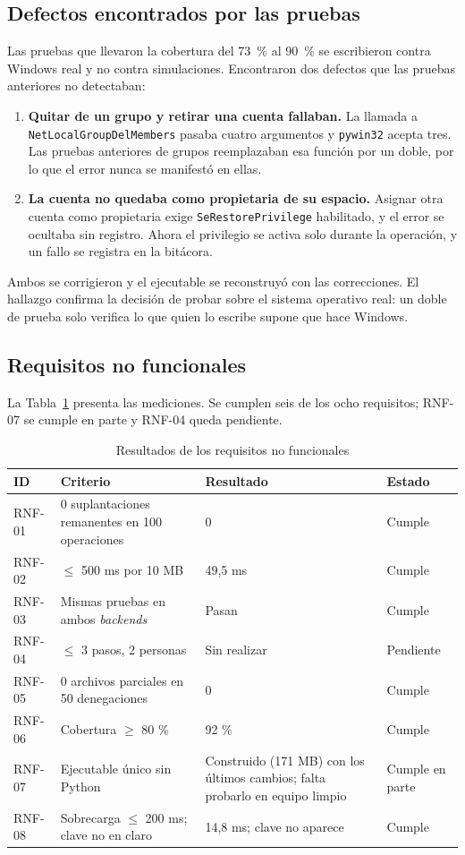 \documentclass[conference]{IEEEtran}
\begin{document}
\subsection{Defectos encontrados por las pruebas}
Las pruebas que llevaron la cobertura del 73~\% al 90~\% se escribieron contra Windows real y no contra simulaciones. Encontraron dos defectos que las pruebas anteriores no detectaban:
\begin{enumerate}
    \item \textbf{Quitar de un grupo y retirar una cuenta fallaban.} La llamada a \texttt{NetLocalGroupDelMembers} pasaba cuatro argumentos y \texttt{pywin32} acepta tres. Las pruebas anteriores de grupos reemplazaban esa función por un doble, por lo que el error nunca se manifestó en ellas.
    \item \textbf{La cuenta no quedaba como propietaria de su espacio.} Asignar otra cuenta como propietaria exige \texttt{SeRestorePrivilege} habilitado, y el error se ocultaba sin registro. Ahora el privilegio se activa solo durante la operación, y un fallo se registra en la bitácora.
\end{enumerate}
Ambos se corrigieron y el ejecutable se reconstruyó con las correcciones. El hallazgo confirma la decisión de probar sobre el sistema operativo real: un doble de prueba solo verifica lo que quien lo escribe supone que hace Windows.

\subsection{Requisitos no funcionales}
La Tabla~\ref{tab:rnfres} presenta las mediciones. Se cumplen seis de los ocho requisitos; RNF-07 se cumple en parte y RNF-04 queda pendiente.

\begin{table}[!t]
\caption{Resultados de los requisitos no funcionales}
\label{tab:rnfres}
\centering
\footnotesize
\setlength{\tabcolsep}{3pt}
\begin{tabular}{|l|p{2.4cm}|p{2.4cm}|p{1.5cm}|}
\hline
\textbf{ID} & \textbf{Criterio} & \textbf{Resultado} & \textbf{Estado} \\
\hline
RNF-01 & 0 suplantaciones remanentes en 100 operaciones & 0 & Cumple \\
\hline
RNF-02 & $\leq$ 500 ms por 10 MB & 49,5 ms & Cumple \\
\hline
RNF-03 & Mismas pruebas en ambos \textit{backends} & Pasan & Cumple \\
\hline
RNF-04 & $\leq$ 3 pasos, 2 personas & Sin realizar & Pendiente \\
\hline
RNF-05 & 0 archivos parciales en 50 denegaciones & 0 & Cumple \\
\hline
RNF-06 & Cobertura $\geq$ 80 \% & 92 \% & Cumple \\
\hline
RNF-07 & Ejecutable único sin Python & Construido (171 MB) con los últimos cambios; falta probarlo en equipo limpio & Cumple en parte \\
\hline
RNF-08 & Sobrecarga $\leq$ 200 ms; clave no en claro & 14,8 ms; clave no aparece & Cumple \\
\hline
\end{tabular}
\end{table}
\end{document}
